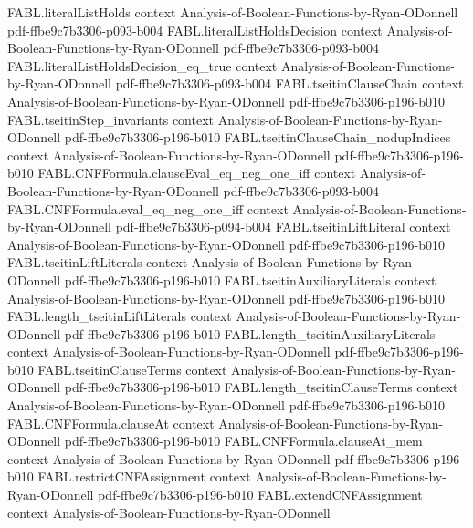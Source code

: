 \begin{theorem}
\proofstep
  {FABL.literalListHolds}
  {context}
  {Analysis-of-Boolean-Functions-by-Ryan-ODonnell}
  {pdf-ffbe9c7b3306-p093-b004}
\proofstep
  {FABL.literalListHoldsDecision}
  {context}
  {Analysis-of-Boolean-Functions-by-Ryan-ODonnell}
  {pdf-ffbe9c7b3306-p093-b004}
\proofstep
  {FABL.literalListHoldsDecision_eq_true}
  {context}
  {Analysis-of-Boolean-Functions-by-Ryan-ODonnell}
  {pdf-ffbe9c7b3306-p093-b004}
\proofstep
  {FABL.tseitinClauseChain}
  {context}
  {Analysis-of-Boolean-Functions-by-Ryan-ODonnell}
  {pdf-ffbe9c7b3306-p196-b010}
\proofstep
  {FABL.tseitinStep_invariants}
  {context}
  {Analysis-of-Boolean-Functions-by-Ryan-ODonnell}
  {pdf-ffbe9c7b3306-p196-b010}
\proofstep
  {FABL.tseitinClauseChain_nodupIndices}
  {context}
  {Analysis-of-Boolean-Functions-by-Ryan-ODonnell}
  {pdf-ffbe9c7b3306-p196-b010}
\proofstep
  {FABL.CNFFormula.clauseEval_eq_neg_one_iff}
  {context}
  {Analysis-of-Boolean-Functions-by-Ryan-ODonnell}
  {pdf-ffbe9c7b3306-p093-b004}
\proofstep
  {FABL.CNFFormula.eval_eq_neg_one_iff}
  {context}
  {Analysis-of-Boolean-Functions-by-Ryan-ODonnell}
  {pdf-ffbe9c7b3306-p094-b004}
\proofstep
  {FABL.tseitinLiftLiteral}
  {context}
  {Analysis-of-Boolean-Functions-by-Ryan-ODonnell}
  {pdf-ffbe9c7b3306-p196-b010}
\proofstep
  {FABL.tseitinLiftLiterals}
  {context}
  {Analysis-of-Boolean-Functions-by-Ryan-ODonnell}
  {pdf-ffbe9c7b3306-p196-b010}
\proofstep
  {FABL.tseitinAuxiliaryLiterals}
  {context}
  {Analysis-of-Boolean-Functions-by-Ryan-ODonnell}
  {pdf-ffbe9c7b3306-p196-b010}
\proofstep
  {FABL.length_tseitinLiftLiterals}
  {context}
  {Analysis-of-Boolean-Functions-by-Ryan-ODonnell}
  {pdf-ffbe9c7b3306-p196-b010}
\proofstep
  {FABL.length_tseitinAuxiliaryLiterals}
  {context}
  {Analysis-of-Boolean-Functions-by-Ryan-ODonnell}
  {pdf-ffbe9c7b3306-p196-b010}
\proofstep
  {FABL.tseitinClauseTerms}
  {context}
  {Analysis-of-Boolean-Functions-by-Ryan-ODonnell}
  {pdf-ffbe9c7b3306-p196-b010}
\proofstep
  {FABL.length_tseitinClauseTerms}
  {context}
  {Analysis-of-Boolean-Functions-by-Ryan-ODonnell}
  {pdf-ffbe9c7b3306-p196-b010}
\proofstep
  {FABL.CNFFormula.clauseAt}
  {context}
  {Analysis-of-Boolean-Functions-by-Ryan-ODonnell}
  {pdf-ffbe9c7b3306-p196-b010}
\proofstep
  {FABL.CNFFormula.clauseAt_mem}
  {context}
  {Analysis-of-Boolean-Functions-by-Ryan-ODonnell}
  {pdf-ffbe9c7b3306-p196-b010}
\proofstep
  {FABL.restrictCNFAssignment}
  {context}
  {Analysis-of-Boolean-Functions-by-Ryan-ODonnell}
  {pdf-ffbe9c7b3306-p196-b010}
\proofstep
  {FABL.extendCNFAssignment}
  {context}
  {Analysis-of-Boolean-Functions-by-Ryan-ODonnell}

\end{theorem}
